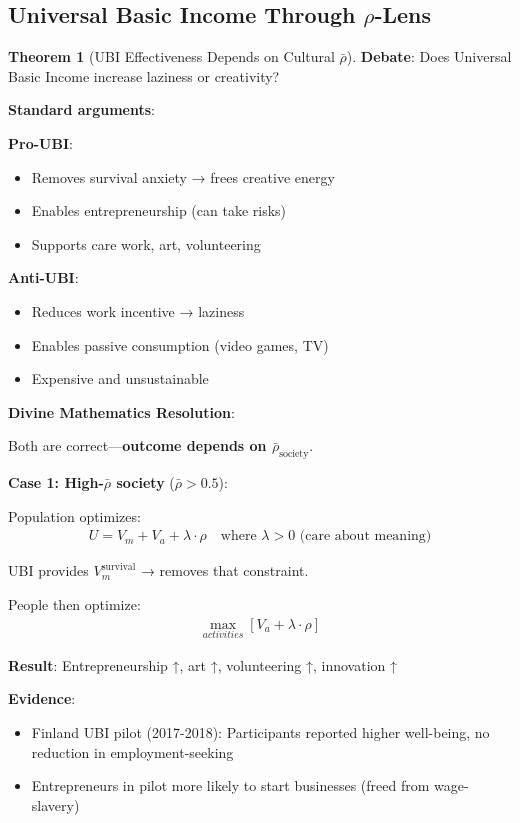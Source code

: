 \documentclass[11pt,a4paper]{article}
\theoremstyle{definition}
\newtheorem{theorem}{Theorem}[section]
\theoremstyle{remark}
\begin{document}
\begin{enumerate}
\subsection{Universal Basic Income Through \(\rho\)-Lens}

\begin{theorem}[UBI Effectiveness Depends on Cultural \(\bar{\rho}\)]
\textbf{Debate}: Does Universal Basic Income increase laziness or creativity?

\textbf{Standard arguments}:

\textbf{Pro-UBI}:
\begin{itemize}
    \item Removes survival anxiety → frees creative energy
    \item Enables entrepreneurship (can take risks)
    \item Supports care work, art, volunteering
\end{itemize}

\textbf{Anti-UBI}:
\begin{itemize}
    \item Reduces work incentive → laziness
    \item Enables passive consumption (video games, TV)
    \item Expensive and unsustainable
\end{itemize}

\textbf{Divine Mathematics Resolution}:

Both are correct—\textbf{outcome depends on \(\bar{\rho}_{\text{society}}\)}.

\textbf{Case 1: High-\(\bar{\rho}\) society} (\(\bar{\rho} > 0.5\)):

Population optimizes:
\begin{align}
U = V_m + V_a + \lambda \cdot \rho \quad \text{where } \lambda > 0 \text{ (care about meaning)}
\end{align}

UBI provides \(V_m^{\text{survival}}\) → removes that constraint.

People then optimize:
\begin{align}
\max_{activities} \left[ V_a + \lambda \cdot \rho \right]
\end{align}

\textbf{Result}: Entrepreneurship ↑, art ↑, volunteering ↑, innovation ↑

\textbf{Evidence}:
\begin{itemize}
    \item Finland UBI pilot (2017-2018): Participants reported higher well-being, no reduction in employment-seeking
    \item Entrepreneurs in pilot more likely to start businesses (freed from wage-slavery)
\end{itemize}


\end{theorem}
\end{enumerate}
\end{document}
